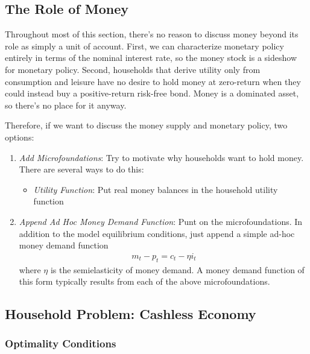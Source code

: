 \documentclass[12pt]{article}
\theoremstyle{plain}
\theoremstyle{definition}
\theoremstyle{remark}
\begin{document}
\subsection{The Role of Money}

Throughout most of this section, there's no reason to discuss money
beyond its role as simply a unit of account.
First, we can characterize monetary policy entirely in terms of the
nominal interest rate, so the money stock is a sideshow for monetary
policy. Second, households that derive utility only from consumption
and leisure have no desire to hold money at zero-return when they could
instead buy a positive-return risk-free bond. Money is a dominated
asset, so there's no place for it anyway.

Therefore, if we want to discuss the money supply and monetary policy,
two options:
\begin{enumerate}[label=(\roman*)]
  \item \emph{Add Microfoundations}:
    Try to motivate why households want to hold money. There are several
    ways to do this:
    \begin{itemize}
      \item \emph{Utility Function}: Put real money balances in the
        household utility function
    \end{itemize}
  \item \emph{Append Ad Hoc Money Demand Function}: Punt on the
    microfoundations. In addition to the model equilibrium conditions,
    just append a simple ad-hoc money demand function
    \begin{align*}
      m_t-p_t= c_t - \eta i_t
    \end{align*}
    where $\eta$ is the semielasticity of money demand. A money demand
    function of this form typically results from each of the above
    microfoundations.

\end{enumerate}

\clearpage
\subsection{Household Problem: Cashless Economy}
\label{sec:singlegood}

\subsubsection{Optimality Conditions}
\end{document}

